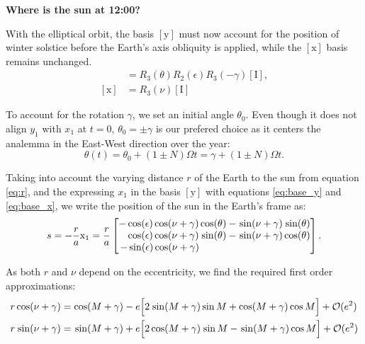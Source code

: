 \documentclass[12pt]{article}
\newcommand{\Sin}{%
  \mathop{\sbox0{$\cos$}\makebox[\wd0][r]{$\sin$}}%
}
\begin{document}
\pagebreak
\textbf{Where is the sun at 12:00?}

With the elliptical orbit, the basis $[\mathrm{y}]$ must now account for the
position of winter solstice before the Earth's axis obliquity is applied,
while the $[\mathrm{x}]$ basis remains unchanged.
\begin{align}
    [\mathrm{y}] &= R_3(\theta) R_2(\epsilon) R_3(-\gamma) [\mathrm{I}],
    \label{eq:base_y}\\
    [\mathrm{x}] &= R_3(\nu) [\mathrm{I}]\label{eq:base_x}
\end{align}

To account for the rotation $\gamma$, we set an initial angle $\theta_0$.
Even though it does not align $y_1$ with $x_1$ at $t=0$, 
$\theta_0=\pm\gamma$ is our prefered choice as it centers the analemma 
in the East-West direction over the year:
\begin{equation}
    \theta(t)=\theta_0+(1 \pm N)\Omega t= \gamma + (1 \pm N)\Omega t.
\end{equation}

Taking into account the varying distance $r$ of the Earth to the sun from 
equation \eqref{eq:r}, and the expressing $x_1$ in the basis $[\mathrm{y}]$
with equations \eqref{eq:base_y} and \eqref{eq:base_x},
we write the position of the sun in the Earth's frame as:
\begin{equation}
    s = -\frac{r}{a} \mathrm{x}_1 =
    \frac{r}{a}\begin{bmatrix}
        -\cos(\epsilon)\cos(\nu+\gamma)\cos(\theta) - \Sin(\nu+\gamma)\Sin(\theta)\\
        \phantom{+}\cos(\epsilon)\cos(\nu+\gamma)\Sin(\theta)-\Sin(\nu+\gamma) \cos(\theta)\\
        -\sin(\epsilon)\cos(\nu+\gamma)\phantom{\Sin(\theta)+\Sin(\nu+\gamma) \cos(\theta)}
    \end{bmatrix}.
    \label{eq:positionEllipse}
\end{equation}

As both $r$ and $\nu$ depend on the eccentricity, we find the required 
first order approximations:
\begin{align}
    r \cos (\nu+\gamma) &= \cos(M+\gamma) - e\Big[
        2\Sin(M+\gamma) \sin M + \cos(M+\gamma)\cos M
    \Big] + \mathcal{O}(e^2)\\
    r \Sin (\nu+\gamma) &= \Sin(M+\gamma) + e\Big[
        2\cos(M+\gamma) \Sin M - \Sin(M+\gamma)\cos M
    \Big] + \mathcal{O}(e^2)
\end{align}
\end{document}
